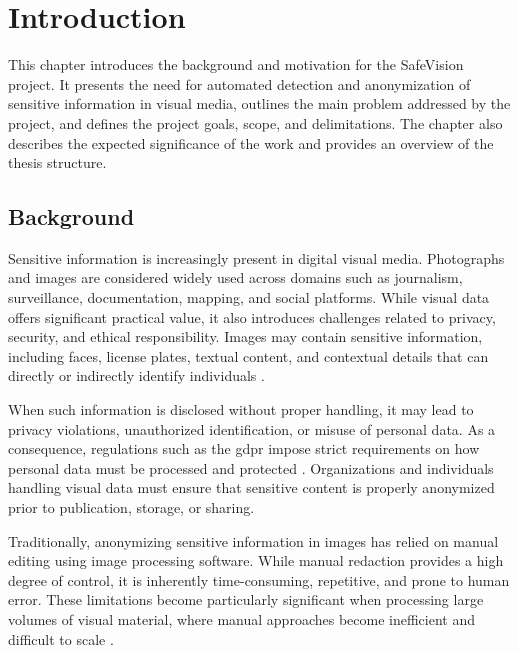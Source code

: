 \chapter{Introduction}
\label{chap:introduction}

This chapter introduces the background and motivation for the \gls{SafeVision} project. It presents the need for automated detection and \gls{anonymization} of sensitive information in visual media, outlines the main problem addressed by the project, and defines the project goals, scope, and delimitations. The chapter also describes the expected significance of the work and provides an overview of the thesis structure. 


\section{Background}

Sensitive information is increasingly present in digital visual media. Photographs and images are considered widely used across domains such as journalism, surveillance, documentation, mapping, and social platforms. While visual data offers significant practical value, it also introduces challenges related to privacy, security, and ethical responsibility. Images may contain sensitive information, including faces, license plates, textual content, and contextual details that can directly or indirectly identify individuals \cite{frome2009large}.

When such information is disclosed without proper handling, it may lead to privacy violations, unauthorized identification, or misuse of personal data. As a consequence, regulations such as the \acrshort{gdpr} impose strict requirements on how personal data must be processed and protected \cite{gdpr2016}. Organizations and individuals handling visual data must ensure that sensitive content is properly anonymized prior to publication, storage, or sharing.

Traditionally, anonymizing sensitive information in images has relied on manual editing using image processing software. While manual redaction provides a high degree of control, it is inherently time-consuming, repetitive, and prone to human error. These limitations become particularly significant when processing large volumes of visual material, where manual approaches become inefficient and difficult to scale \cite{piao2024deidentification}.

